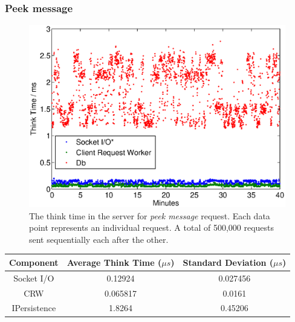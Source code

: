 \documentclass{article}
\begin{document}
            \subsubsection{Peek message}
                \begin{figure}[H]
                    \includegraphics[scale=0.50]{thinktime_500k_peek}
                    \caption{The think time in the server for \textit{peek message} request. Each data point represents an individual request. A total of 500,000 requests sent sequentially each after the other.}
                    \label{fig:thinktime_500k_peek}
                \end{figure}
                \begin{table}[H]
                    \begin{tabular}{|c|c|c|}
                        \hline 
                        \textbf{Component} & \textbf{Average Think Time} ($\mu s$)  & \textbf{Standard Deviation ($\mu s$)} \\ 
                        \hline 
                        Socket I/O &0.12924 &0.027456\\
                        \hline 
                        CRW &0.065817 &0.0161\\
                        \hline 
                        IPersistence &1.8264 &0.45206\\
                        \hline 
                    \end{tabular}
                \end{table} 
\end{document}

